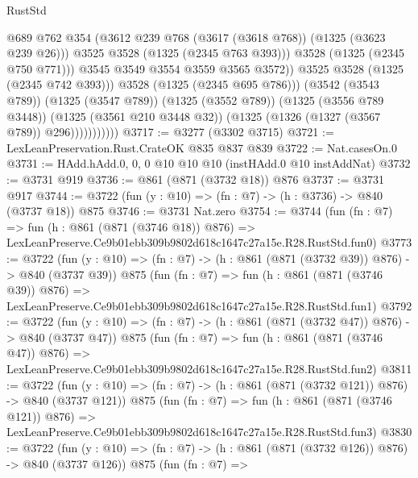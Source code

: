 \begin{lexlean}{RustStd}
\begin{coremodule}
                                  @689
                                  @762
                                  @354
                                  (@3612 @239 @768 (@3617 (@3618 @768)) (@1325 (@3623 @239 @26)))
                                  @3525
                                  @3528
                                  (@1325 (@2345 @763 @393)))
                                @3528
                                (@1325 (@2345 @750 @771)))
                              @3545
                              @3549
                              @3554
                              @3559
                              @3565
                              @3572))
                          @3525
                          @3528
                          (@1325 (@2345 @742 @393)))
                        @3528
                        (@1325 (@2345 @695 @786)))
                      (@3542 (@3543 @789))
                      (@1325 (@3547 @789))
                      (@1325 (@3552 @789))
                      (@1325 (@3556 @789 @3448))
                      (@1325 (@3561 @210 @3448 @32))
                      (@1325 (@1326 (@1327 (@3567 @789)) @296)))))))))))
@3717 := @3277 (@3302 @3715)
@3721 := LexLeanPreservation.Rust.CrateOK @835 @837 @839
@3722 := Nat.casesOn.{0}
@3731 := HAdd.hAdd.{0, 0, 0} @10 @10 @10 (instHAdd.{0} @10 instAddNat)
@3732 := @3731 @919
@3736 := @861 (@871 (@3732 @18)) @876
@3737 := @3731 @917
@3744 := @3722 (fun (y : @10) => (fn : @7) -> (h : @3736) -> @840 (@3737 @18)) @875
@3746 := @3731 Nat.zero
@3754 := @3744
    (fun (fn : @7) =>
    fun (h : @861 (@871 (@3746 @18)) @876) =>
    LexLeanPreserve.Ce9b01ebb309b9802d618c1647c27a15e.R28.RustStd.fun0)
@3773 := @3722
    (fun (y : @10) => (fn : @7) -> (h : @861 (@871 (@3732 @39)) @876) -> @840 (@3737 @39))
    @875
    (fun (fn : @7) =>
    fun (h : @861 (@871 (@3746 @39)) @876) =>
    LexLeanPreserve.Ce9b01ebb309b9802d618c1647c27a15e.R28.RustStd.fun1)
@3792 := @3722
    (fun (y : @10) => (fn : @7) -> (h : @861 (@871 (@3732 @47)) @876) -> @840 (@3737 @47))
    @875
    (fun (fn : @7) =>
    fun (h : @861 (@871 (@3746 @47)) @876) =>
    LexLeanPreserve.Ce9b01ebb309b9802d618c1647c27a15e.R28.RustStd.fun2)
@3811 := @3722
    (fun (y : @10) => (fn : @7) -> (h : @861 (@871 (@3732 @121)) @876) -> @840 (@3737 @121))
    @875
    (fun (fn : @7) =>
    fun (h : @861 (@871 (@3746 @121)) @876) =>
    LexLeanPreserve.Ce9b01ebb309b9802d618c1647c27a15e.R28.RustStd.fun3)
@3830 := @3722
    (fun (y : @10) => (fn : @7) -> (h : @861 (@871 (@3732 @126)) @876) -> @840 (@3737 @126))
    @875
    (fun (fn : @7) =>

\end{coremodule}
\end{lexlean}
